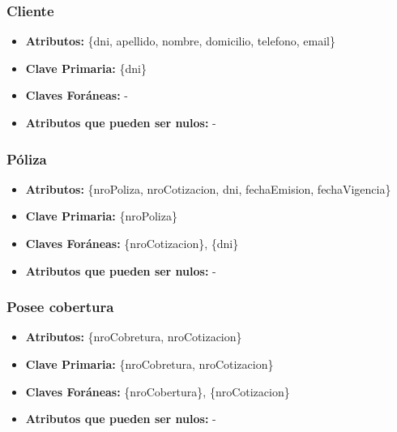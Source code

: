 \documentclass[a4paper,11pt]{article}
\begin{document}
\subsubsection{Cliente}

\begin{itemize}

	\item \textbf{Atributos:} \{dni, apellido, nombre, domicilio, telefono, email\}

	\item \textbf{Clave Primaria:} \{dni\}

	\item \textbf{Claves Foráneas:} -

	\item \textbf{Atributos que pueden ser nulos:} -
	
\end{itemize}

\subsubsection{Póliza}

\begin{itemize}

	\item \textbf{Atributos:} \{nroPoliza, nroCotizacion, dni, fechaEmision, fechaVigencia\}

	\item \textbf{Clave Primaria:} \{nroPoliza\}

	\item \textbf{Claves Foráneas:} \{nroCotizacion\}, \{dni\}

	\item \textbf{Atributos que pueden ser nulos:} -
	
\end{itemize}

\subsubsection{Posee cobertura}

\begin{itemize}

	\item \textbf{Atributos:} \{nroCobretura, nroCotizacion\}

	\item \textbf{Clave Primaria:} \{nroCobretura, nroCotizacion\}
	
	\item \textbf{Claves Foráneas:} \{nroCobertura\}, \{nroCotizacion\}

	\item \textbf{Atributos que pueden ser nulos:} -
	
\end{itemize}
\end{document}
